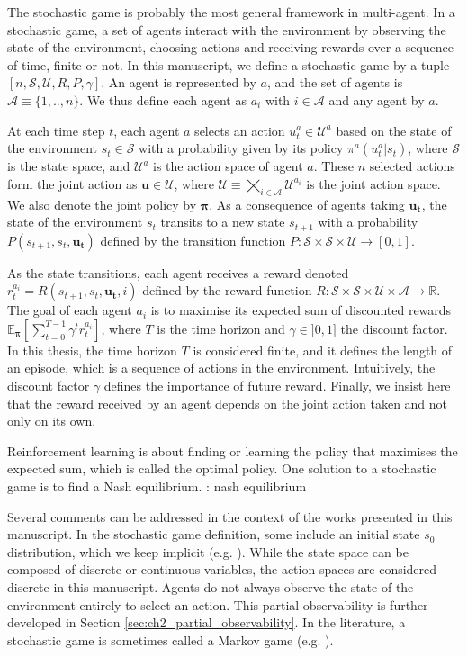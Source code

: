 The stochastic game \citep{stochasticGames} is probably the most general framework in multi-agent.
In a stochastic game, a set of agents interact with the environment by observing the state of the environment, choosing actions and receiving rewards over a sequence of time, finite or not.
In this manuscript, we define a stochastic game by a tuple $[n, \mathcal{S}, \mathcal{U}, R, P, \gamma]$.
An agent is represented by $a$, and the set of agents is $\mathcal{A} \equiv \{1,..,n\}$.
We thus define each agent as $a_i$ with $i \in \mathcal{A}$ and any agent by $a$.

At each time step $t$, each agent $a$ selects an action $u_t^a \in \mathcal{U}^a$ based on the state of the environment $s_t \in \mathcal{S}$ with a probability given by its policy $\pi^a(u^a_t|s_t)$, where $\mathcal{S}$ is the state space, and $\mathcal{U}^a$ is the action space of agent $a$.
These $n$ selected actions form the joint action as $\mathbf{u} \in \mathcal{U}$, where $\mathcal{U} \equiv \bigtimes_{i \in \mathcal{A}} \mathcal{U}^{a_i}$ is the joint action space.
We also denote the joint policy by $\mathbf{\pi}$.
As a consequence of agents taking $\mathbf{u_t}$, the state of the environment $s_t$ transits to a new state $s_{t+1}$ with a probability $P(s_{t+1}, s_t, \mathbf{u_t})$ defined by the transition function $P:\mathcal{S} \times \mathcal{S} \times \mathcal{U} \rightarrow [0,1]$.

As the state transitions, each agent receives a reward denoted $r_t^{a_i} = R(s_{t+1}, s_t, \mathbf{u_t}, i)$ defined by the reward function $R: \mathcal{S} \times \mathcal{S} \times \mathcal{U} \times \mathcal{A} \rightarrow \mathbb{R}$.
The goal of each agent $a_i$ is to maximise its expected sum of discounted rewards $\mathbb{E}_{\mathbf{\pi}}\left[ \sum_{t=0}^{T-1} \gamma^t r^{a_i}_t \right]$, where $T$ is the time horizon and $\gamma \in ]0, 1]$ the discount factor.
In this thesis, the time horizon $T$ is considered finite, and it defines the length of an episode, which is a sequence of actions in the environment.
Intuitively, the discount factor $\gamma$ defines the importance of future reward.
Finally, we insist here that the reward received by an agent depends on the joint action taken and not only on its own.

Reinforcement learning is about finding or learning the policy that maximises the expected sum, which is called the optimal policy.
One solution to a stochastic game is to find a Nash equilibrium.
\todo: nash equilibrium

Several comments can be addressed in the context of the works presented in this manuscript.
In the stochastic game definition, some include an initial state $s_0$ distribution, which we keep implicit (e.g. \citep{marl-book}).
While the state space can be composed of discrete or continuous variables, the action spaces are considered discrete in this manuscript.
Agents do not always observe the state of the environment entirely to select an action.
This partial observability is further developed in Section \ref{sec:ch2_partial_observability}.
In the literature, a stochastic game is sometimes called a Markov game (e.g. \citep{MarkovGames}).

